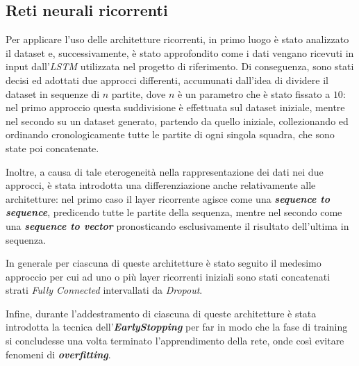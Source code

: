 \subsection{Reti neurali ricorrenti}\label{sec:rnn}
Per applicare l'uso delle architetture ricorrenti, in primo luogo è stato analizzato il dataset e, successivamente, è stato approfondito come i dati vengano ricevuti in input dall'\textit{LSTM} utilizzata nel progetto di riferimento. Di conseguenza, sono stati decisi ed adottati due approcci differenti, accumunati dall'idea di dividere il dataset in sequenze di $n$ partite, dove $n$ è un parametro che è stato fissato a $10$: nel primo approccio questa suddivisione è effettuata sul dataset iniziale, mentre nel secondo su un dataset generato, partendo da quello iniziale, collezionando ed ordinando cronologicamente tutte le partite di ogni singola squadra, che sono state poi concatenate.

Inoltre, a causa di tale eterogeneità nella rappresentazione dei dati nei due approcci, è stata introdotta una differenziazione anche relativamente alle architetture: nel primo caso il layer ricorrente agisce come una \textbf{\textit{sequence to sequence}}, predicendo tutte le partite della sequenza, mentre nel secondo come una \textbf{\textit{sequence to vector}} pronosticando esclusivamente il risultato dell'ultima in sequenza. 

In generale per ciascuna di queste architetture è stato seguito il medesimo approccio per cui ad uno o più layer ricorrenti iniziali sono stati concatenati strati \textit{Fully Connected} intervallati da \textit{Dropout}.

Infine, durante l'addestramento di ciascuna di queste architetture è stata introdotta la tecnica dell'\textbf{\textit{EarlyStopping}} per far in modo che la fase di training si concludesse una volta terminato l'apprendimento della rete, onde così evitare fenomeni di \textbf{\textit{overfitting}}.

